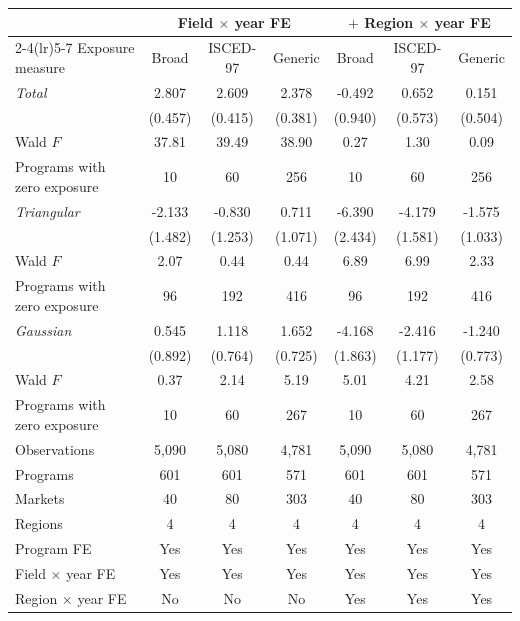 \begin{tabular}{lcccccc}
\toprule
 & \multicolumn{3}{c}{Field \(\times\) year FE} & \multicolumn{3}{c}{\(+\) Region \(\times\) year FE} \\
\cmidrule(lr){2-4}\cmidrule(lr){5-7}
Exposure measure & Broad & ISCED-97 & Generic & Broad & ISCED-97 & Generic \\
\midrule
\textit{Total} &  2.807\sym{***} &  2.609\sym{***} &  2.378\sym{***} & -0.492 &  0.652 &  0.151 \\
 & (0.457) & (0.415) & (0.381) & (0.940) & (0.573) & (0.504) \\
\quad Wald \(F\) & 37.81 & 39.49 & 38.90 &  0.27 &  1.30 &  0.09 \\
\quad Programs with zero exposure &        10 &        60 &       256 &        10 &        60 &       256 \\
\addlinespace
\textit{Triangular} & -2.133 & -0.830 &  0.711 & -6.390\sym{**} & -4.179\sym{***} & -1.575 \\
 & (1.482) & (1.253) & (1.071) & (2.434) & (1.581) & (1.033) \\
\quad Wald \(F\) &  2.07 &  0.44 &  0.44 &  6.89 &  6.99 &  2.33 \\
\quad Programs with zero exposure &        96 &       192 &       416 &        96 &       192 &       416 \\
\addlinespace
\textit{Gaussian} &  0.545 &  1.118 &  1.652\sym{**} & -4.168\sym{**} & -2.416\sym{**} & -1.240 \\
 & (0.892) & (0.764) & (0.725) & (1.863) & (1.177) & (0.773) \\
\quad Wald \(F\) &  0.37 &  2.14 &  5.19 &  5.01 &  4.21 &  2.58 \\
\quad Programs with zero exposure &        10 &        60 &       267 &        10 &        60 &       267 \\
\midrule
Observations &     5,090 &     5,080 &     4,781 &     5,090 &     5,080 &     4,781 \\
Programs &       601 &       601 &       571 &       601 &       601 &       571 \\
Markets &        40 &        80 &       303 &        40 &        80 &       303 \\
Regions &         4 &         4 &         4 &         4 &         4 &         4 \\
Program FE & Yes & Yes & Yes & Yes & Yes & Yes \\
Field \(\times\) year FE & Yes & Yes & Yes & Yes & Yes & Yes \\
Region \(\times\) year FE & No & No & No & Yes & Yes & Yes \\
\bottomrule
\end{tabular}
